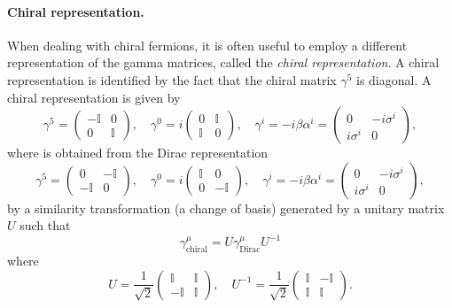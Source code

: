 \paragraph{Chiral representation.}
When dealing with chiral fermions, it is often useful to employ a different representation of the gamma matrices, called the \textit{chiral representation}. A chiral representation is identified by the fact that the chiral matrix \(\gamma^5\) is diagonal. A chiral representation is given by
\[
    \gamma^5 = \begin{pmatrix}
        -\mathbb{I} & 0          \\
        0           & \mathbb{I}
    \end{pmatrix}, \quad \gamma^{0} = i\begin{pmatrix}
        0          & \mathbb{I} \\
        \mathbb{I} & 0
    \end{pmatrix}, \quad \gamma^{i} = -i \beta \alpha^i = \begin{pmatrix}
        0         & -i \sigma^i \\
        i\sigma^i & 0
    \end{pmatrix},
\]
where is obtained from the Dirac representation
\[
    \gamma^5 = \begin{pmatrix}
        0           & -\mathbb{I} \\
        -\mathbb{I} & 0
    \end{pmatrix}, \quad \gamma^{0} = i\begin{pmatrix}
        \mathbb{I} & 0           \\
        0          & -\mathbb{I}
    \end{pmatrix}, \quad \gamma^{i} = -i \beta \alpha^i = \begin{pmatrix}
        0         & -i \sigma^i \\
        i\sigma^i & 0
    \end{pmatrix},
\]
by a similarity transformation (a change of basis) generated by a unitary matrix \(U\) such that
\[
    \gamma^{\mu}_{\text{chiral}} = U \gamma^{\mu}_\text{Dirac} U^{-1}
\]
where
\[
    U = \frac{1}{\sqrt{2}} \begin{pmatrix}
        \mathbb{I}  & \mathbb{I} \\
        -\mathbb{I} & \mathbb{I}
    \end{pmatrix}, \quad U^{-1} = \frac{1}{\sqrt{2}} \begin{pmatrix}
        \mathbb{I} & -\mathbb{I} \\
        \mathbb{I} & \mathbb{I}
    \end{pmatrix}.
\]
